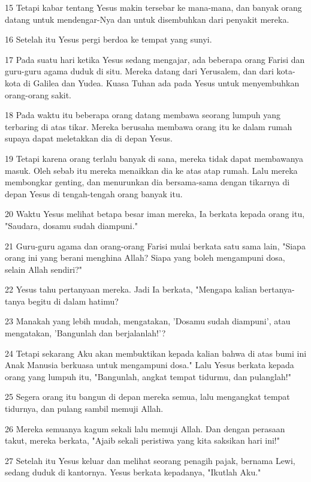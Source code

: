 \par 15 Tetapi kabar tentang Yesus makin tersebar ke mana-mana, dan banyak orang datang untuk mendengar-Nya dan untuk disembuhkan dari penyakit mereka.
\par 16 Setelah itu Yesus pergi berdoa ke tempat yang sunyi.
\par 17 Pada suatu hari ketika Yesus sedang mengajar, ada beberapa orang Farisi dan guru-guru agama duduk di situ. Mereka datang dari Yerusalem, dan dari kota-kota di Galilea dan Yudea. Kuasa Tuhan ada pada Yesus untuk menyembuhkan orang-orang sakit.
\par 18 Pada waktu itu beberapa orang datang membawa seorang lumpuh yang terbaring di atas tikar. Mereka berusaha membawa orang itu ke dalam rumah supaya dapat meletakkan dia di depan Yesus.
\par 19 Tetapi karena orang terlalu banyak di sana, mereka tidak dapat membawanya masuk. Oleh sebab itu mereka menaikkan dia ke atas atap rumah. Lalu mereka membongkar genting, dan menurunkan dia bersama-sama dengan tikarnya di depan Yesus di tengah-tengah orang banyak itu.
\par 20 Waktu Yesus melihat betapa besar iman mereka, Ia berkata kepada orang itu, "Saudara, dosamu sudah diampuni."
\par 21 Guru-guru agama dan orang-orang Farisi mulai berkata satu sama lain, "Siapa orang ini yang berani menghina Allah? Siapa yang boleh mengampuni dosa, selain Allah sendiri?"
\par 22 Yesus tahu pertanyaan mereka. Jadi Ia berkata, "Mengapa kalian bertanya-tanya begitu di dalam hatimu?
\par 23 Manakah yang lebih mudah, mengatakan, 'Dosamu sudah diampuni', atau mengatakan, 'Bangunlah dan berjalanlah!'?
\par 24 Tetapi sekarang Aku akan membuktikan kepada kalian bahwa di atas bumi ini Anak Manusia berkuasa untuk mengampuni dosa." Lalu Yesus berkata kepada orang yang lumpuh itu, "Bangunlah, angkat tempat tidurmu, dan pulanglah!"
\par 25 Segera orang itu bangun di depan mereka semua, lalu mengangkat tempat tidurnya, dan pulang sambil memuji Allah.
\par 26 Mereka semuanya kagum sekali lalu memuji Allah. Dan dengan perasaan takut, mereka berkata, "Ajaib sekali peristiwa yang kita saksikan hari ini!"
\par 27 Setelah itu Yesus keluar dan melihat seorang penagih pajak, bernama Lewi, sedang duduk di kantornya. Yesus berkata kepadanya, "Ikutlah Aku."
